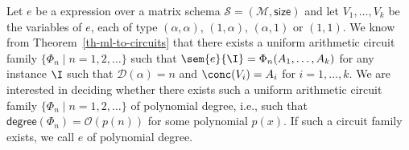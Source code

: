 \newtheorem*{Undec}{Proposition~\ref{prop-undec}}
Let $e$ be a \langfor expression over a matrix schema $\mathcal{S}=(\mathcal{M},\textsf{size})$ and let $V_1,\ldots, V_k$ be
the variables of $e$, each of type $(\alpha,\alpha)$, $(1,\alpha)$, $(\alpha,1)$ or $(1,1)$. We know from Theorem~\ref{th-ml-to-circuits}
that there exists a uniform arithmetic circuit family $\{\Phi_n \mid n=1,2,\ldots\}$
such that $\sem{e}{\I}=\Phi_n(A_1,\ldots,A_k)$ for any instance $\I$ such that
$\mathcal{D}(\alpha)=n$ and $\conc(V_i)=A_i$ for $i=1,\ldots,k$. We are interested in deciding
whether there exists such a  uniform arithmetic circuit family $\{\Phi_n \mid n=1,2,\ldots\}$
of polynomial degree, i.e., such that $\mathsf{degree}(\Phi_n)=\mathcal{O}(p(n))$ for some polynomial $p(x)$. If such a circuit family exists, we call $e$ of polynomial degree.

